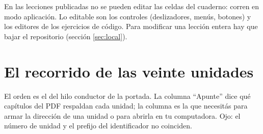 \documentclass[11pt,a4paper]{report}
\newcommand{\clave}[1]{\texttt{\detokenize{#1}}}
\begin{document}
\begin{atencion}
En las lecciones publicadas no se pueden editar las celdas del cuaderno: corren en modo aplicación. Lo editable son los controles (deslizadores, menús, botones) y los editores de los ejercicios de código. Para modificar una lección entera hay que bajar el repositorio (sección \ref{sec:local}).
\end{atencion}

\section{El recorrido de las veinte unidades}\label{sec:recorrido}

El orden es el del hilo conductor de la portada. La columna \enquote{Apunte} dice qué capítulos del PDF respaldan cada unidad; la columna \clave{<id>} es la que necesitás para armar la dirección de una unidad o para abrirla en tu computadora. Ojo: el número de unidad y el prefijo del identificador no coinciden.
\end{document}
